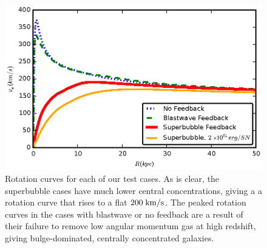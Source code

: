\begin{figure}
    \includegraphics[width=\textwidth]{figures2/rotation_curve.eps}
    \caption[Rotation curves with different feedback models]{Rotation curves for
    each of our test cases.  As is clear, the superbubble cases have much lower
    central concentrations, giving a a rotation curve that rises to a flat
    $200\; \rm{km/s}$.  The peaked rotation curves in the cases with blastwave
    or no feedback are a result of their failure to remove low angular momentum
    gas at high redshift, giving bulge-dominated, centrally concentrated
    galaxies.}
    \label{rotation_curve}
\end{figure}
